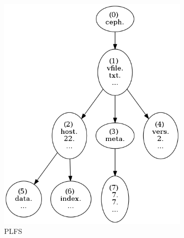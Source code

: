 \begin{figure}[t]
\begin{subfigure}[b]{.3\linewidth}
      \includegraphics[width=1.0\linewidth]{figures/tree_plfs.png}
      \caption{PLFS} \label{fig:plfs}
  \end{subfigure}
  \begin{subfigure}[b]{.3\linewidth}
      \centering

\end{subfigure}
\end{figure}
